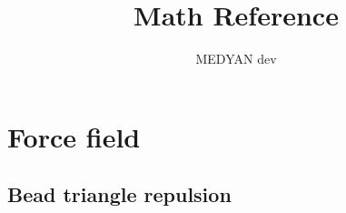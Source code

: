 \documentclass{article}
\title{Math Reference}
\author{MEDYAN dev}
\date{}
\begin{document}
\maketitle

\section{Force field}
\subsection{Bead triangle repulsion}

\end{document}
